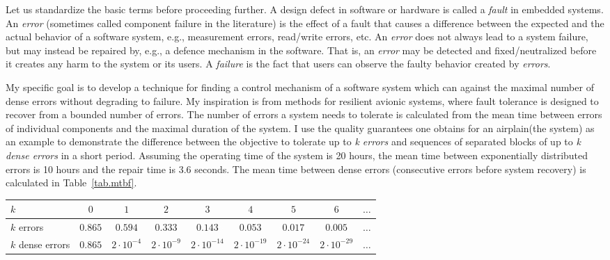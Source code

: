 Let us standardize the basic terms before proceeding further.
A design defect in software or hardware is called a {\it fault} in embedded systems.
An {\it error} (sometimes called component failure in the literature) is the effect of a fault that causes a difference between the expected and the actual behavior of a software system, e.g., measurement errors, read/write errors, etc. 
An {\it error} does not always lead to a system failure, but may instead be repaired by, e.g., a defence mechanism in the software. 
That is, an {\it error} may be detected and fixed/neutralized before it creates any harm to the system or its users.
A {\it failure} is the fact that users can observe the faulty behavior created by {\it errors}.

My specific goal is to develop a technique for finding a control mechanism of a software system which can against the maximal number of dense errors without degrading to failure.
My inspiration is from methods for resilient avionic systems\cite{conf/ftrtft/Rushby92}, where fault tolerance is designed to recover from a bounded number of errors.
The number of errors a system needs to tolerate is calculated from the mean time between errors of individual components and the maximal duration of the system.
I use the quality guarantees one obtains for an airplain(the system) as an example to demonstrate the difference between the objective to tolerate up to {\it k errors} and sequences of separated blocks of up to {\it k dense errors} in a short period.
Assuming the operating time of the system is 20 hours, the mean time between exponentially distributed errors is 10 hours and the repair time is 3.6 seconds.
The mean time between dense errors (consecutive errors before system recovery) is calculated in Table~\ref{tab.mtbf}.
\begin{table*}
\begin{center}
\begin{tabular}{l||c|c|c|c|c|c|c|c}\hline 
$k$              & $0$     & $1$     &    $2$   &  $3$  & $4$ & $5$ & $6$ & $\ldots$ \\\hline 
$k$ errors       & $0.865$ & $0.594$ & $0.333$ & $0.143$ & $0.053$ & $0.017$ & $0.005$ & $\ldots$ \\
$k$ dense errors & $0.865$ & $2 \cdot 10^{-4}$ & $2 \cdot 10^{-9}$ & $2 \cdot 10^{-14}$ & $2\cdot 10^{-19}$ & $2\cdot 10^{-24}$ & $2\cdot 10^{-29}$ & $\ldots$ 
\\ \hline 
\end{tabular}
\end{center}
\caption{Probabilities of $k$ dense errors} 
\label{tab.mtbf} 
\end{table*} 
